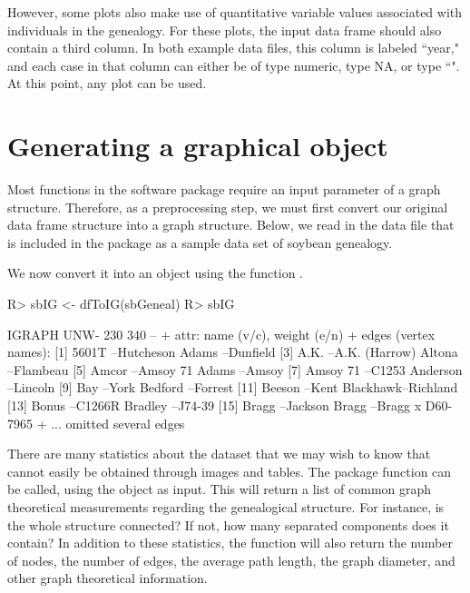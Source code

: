 \documentclass[article,shortnames]{jss}
\begin{document}
However, some  plots also make use of quantitative variable values associated with individuals in the genealogy. For these plots, the input data frame should also contain a third column. In both example data files, this column is labeled ``year," and each case in that column can either be of type numeric, type NA, or type ``". At this point, any  plot can be used.

\section{Generating a graphical object}
\label{ggo}

Most functions in the  software package require an input parameter of a graph structure. Therefore, as a preprocessing step, we must first convert our original data frame structure into a graph structure. Below, we read in the  data file  that is included in the package as a sample data set of soybean genealogy.

We now convert it into an  object  using the function 
.
\begin{CodeChunk}
\begin{CodeInput}
R> sbIG <- dfToIG(sbGeneal)
R> sbIG
\end{CodeInput}
\begin{CodeOutput}
IGRAPH UNW- 230 340 -- 
+ attr: name (v/c), weight (e/n)
+ edges (vertex names):
 [1] 5601T    --Hutcheson        Adams    --Dunfield        
 [3] A.K.     --A.K. (Harrow)    Altona   --Flambeau        
 [5] Amcor    --Amsoy 71         Adams    --Amsoy           
 [7] Amsoy 71 --C1253            Anderson --Lincoln         
 [9] Bay      --York             Bedford  --Forrest         
[11] Beeson   --Kent             Blackhawk--Richland        
[13] Bonus    --C1266R           Bradley  --J74-39          
[15] Bragg    --Jackson          Bragg    --Bragg x D60-7965
+ ... omitted several edges
\end{CodeOutput}
\end{CodeChunk}

There are many statistics about the  dataset that we may wish to know that cannot easily be obtained through images and tables. The package function  can be called, using the  object as input. This will return a list of common graph theoretical measurements regarding the genealogical structure. For instance, is the whole structure connected? If not, how many separated components does it contain? In addition to these statistics, the  function will also return the number of nodes, the number of edges, the average path length, the graph diameter, and other graph theoretical information.
\end{document}
